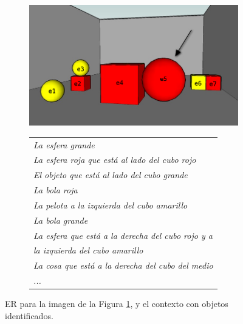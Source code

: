 \begin{itemize}
\begin{figure}[H]
\begin{subfigure}{.5\textwidth}
\centering
\includegraphics[width=\textwidth]{images/22.jpg}\\[0pt]
\caption{}
\label{GRE3D7-stimulus}
\vspace*{.1cm}
\end{subfigure}
\hspace*{0cm}
\begin{subfigure}{.5\textwidth}
\centering
\begin{tabular}{l}
 {\it La esfera grande}\\
 {\it La esfera roja que est\'a al lado del cubo rojo} \\
 {\it El objeto que est\'a al lado del cubo grande}\\
 {\it La bola roja}\\
 {\it La pelota a la izquierda del cubo amarillo}\\
 {\it La bola grande}\\
 {\it La esfera que est\'a a la derecha del cubo rojo y a }\\
 {\it la izquierda del cubo amarillo}\\
 {\it La cosa que est\'a a la derecha del cubo del medio}\\
 {\it ...}
 \end{tabular}
\caption{}
\label{GRE3D7-stimulus-er}
\end{subfigure}
\caption{ER para la imagen de la Figura \protect\ref{GRE3D7-stimulus}, y el contexto con objetos identificados.}

\end{figure}



\end{itemize}
